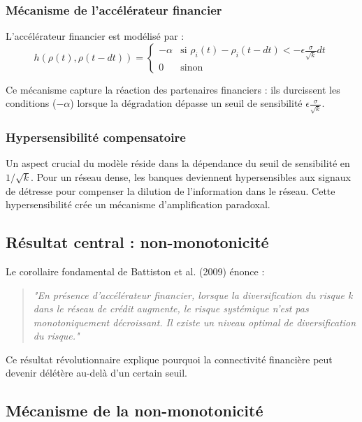 \documentclass[12pt,a4paper,twoside]{article}
\begin{document}
\subsubsection{Mécanisme de l'accélérateur financier}

L'accélérateur financier est modélisé par :
$$h(\rho(t),\rho(t-dt)) = \begin{cases}
-\alpha & \text{si } \rho_i(t) - \rho_i(t-dt) < -\epsilon\frac{\sigma}{\sqrt{k}}dt \\
0 & \text{sinon}
\end{cases}$$

Ce mécanisme capture la réaction des partenaires financiers : ils durcissent les conditions ($-\alpha$) lorsque la dégradation dépasse un seuil de sensibilité $\epsilon\frac{\sigma}{\sqrt{k}}$.

\subsubsection{Hypersensibilité compensatoire}

Un aspect crucial du modèle réside dans la dépendance du seuil de sensibilité en $1/\sqrt{k}$. Pour un réseau dense, les banques deviennent hypersensibles aux signaux de détresse pour compenser la dilution de l'information dans le réseau. Cette hypersensibilité crée un mécanisme d'amplification paradoxal.

\subsection{Résultat central : non-monotonicité}

Le corollaire fondamental de Battiston et al. (2009) énonce :

\begin{quote}
\textit{"En présence d'accélérateur financier, lorsque la diversification du risque k dans le réseau de crédit augmente, le risque systémique n'est pas monotoniquement décroissant. Il existe un niveau optimal de diversification du risque."}
\end{quote}

Ce résultat révolutionnaire explique pourquoi la connectivité financière peut devenir délétère au-delà d'un certain seuil.

\subsection{Mécanisme de la non-monotonicité}
\end{document}
